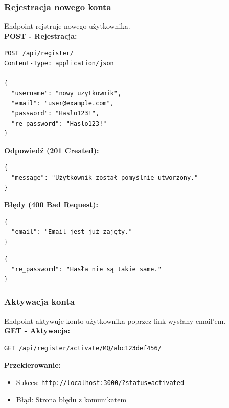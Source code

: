 \documentclass[a4paper,12pt]{article}
\begin{document}
\subsubsection{Rejestracja nowego konta}

Endpoint rejstruje nowego użytkownika. \\

\textbf{POST - Rejestracja:}
\begin{lstlisting}
POST /api/register/
Content-Type: application/json

{
  "username": "nowy_uzytkownik",
  "email": "user@example.com",
  "password": "Haslo123!",
  "re_password": "Haslo123!"
}
\end{lstlisting}

\vspace{0.5cm}

\textbf{Odpowiedź (201 Created):}
\begin{lstlisting}
{
  "message": "Użytkownik został pomyślnie utworzony."
}
\end{lstlisting}

\vspace{0.5cm}

\textbf{Błędy (400 Bad Request):}
\begin{lstlisting}
{
  "email": "Email jest już zajęty."
}
\end{lstlisting}

\begin{lstlisting}
{
  "re_password": "Hasła nie są takie same."
}
\end{lstlisting}

\newpage

\subsubsection{Aktywacja konta}

Endpoint aktywuje konto użytkownika poprzez link wysłany email'em. \\

\textbf{GET - Aktywacja:}
\begin{lstlisting}
GET /api/register/activate/MQ/abc123def456/
\end{lstlisting}

\vspace{0.5cm}

\textbf{Przekierowanie:}
\begin{itemize}[label=\textbullet]
    \item Sukces: \texttt{http://localhost:3000/?status=activated}
    \item Błąd: Strona błędu z komunikatem
\end{itemize}
\end{document}
